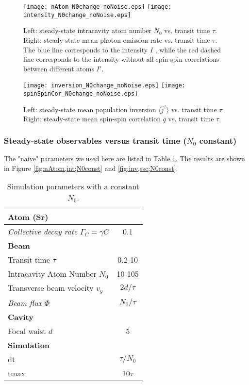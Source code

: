\documentclass{article}
\newcommand{\gc}{\Gamma_C}
\begin{document}
\begin{figure}[H]
\centering
\texttt{[image: nAtom\_N0change\_noNoise.eps]}
\texttt{[image: intensity\_N0change\_noNoise.eps]}
\caption{Left: steady-state intracavity atom number $N_0$ vs. transit time $\tau$. Right: steady-state mean photon emission rate vs. transit time $\tau$. The blue line corresponds to the intensity $I$ , while the red dashed line corresponds to the intensity without all spin-spin correlations between different atoms $I'$.}
\label{fig:nAtom,int;N0change}
\end{figure}

\begin{figure}[!ht]
\centering
\texttt{[image: inversion\_N0change\_noNoise.eps]}
\texttt{[image: spinSpinCor\_N0change\_noNoise.eps]}
\caption{Left: steady-state mean population inversion $\langle \hat{j}^z \rangle$ vs. transit time $\tau$. Right: steady-state mean spin-spin correlation $q$ vs. transit time $\tau$.}
\label{fig:inv,ssc;N0change}
\end{figure}








\subsubsection{Steady-state observables versus transit time ($N_0$ constant)}
\label{subsubsectionN0const}
The "naive" parameters we used here are listed in Table \ref{paramN0const}. The results are shown in Figure \ref{fig:nAtom,int;N0const} and \ref{fig:inv,ssc;N0const}.

\begin{table}[ht]
    \centering
    \begin{tabular}{ |l |c|   }
\hline
\textbf{Atom (Sr)} & \\\hline
\textit{Collective decay rate} $\gc = \gamma C$  & 0.1\\\hline
\textbf{Beam} & \\\hline
Transit time $\tau$ & 0.2-10\\\hline
Intracavity Atom Number $N_0$ & 10-105\\\hline
Transverse beam velocity $v_y$ & $2d/\tau$\\\hline
\textit{Beam flux} $\Phi$  & $N_0/\tau$\\\hline
\textbf{Cavity} & \\\hline
Focal waist $d$  & 5\\\hline
\textbf{Simulation}&\\\hline
dt & $\tau/N_0$\\\hline
tmax & 10$\tau$ \\\hline
\end{tabular}
    \caption{Simulation parameters with a constant $N_0$.}
    \label{paramN0const}
\end{table}
\end{document}
